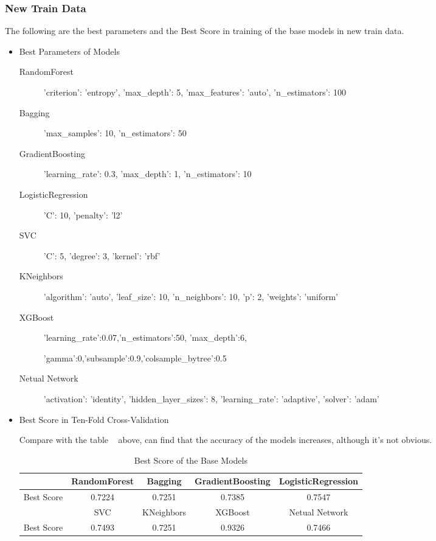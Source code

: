 \subsubsection{New Train Data}

The following are the best parameters and 
the Best Score in training of 
the base models 
in new train data. 

\begin{itemize}
	\item Best Parameters of Models
	\begin{description}
		\item[RandomForest] 'criterion': 'entropy', 'max_depth': 5, 
		'max_features': 'auto', 'n_estimators': 100 
		\item[Bagging] 'max_samples': 10, 'n_estimators': 50
		\item[GradientBoosting] 'learning_rate': 0.3, 
		'max_depth': 1, 'n_estimators': 10
		\item[LogisticRegression] 'C': 10, 'penalty': 'l2'
		\item[SVC] 'C': 5, 'degree': 3, 'kernel': 'rbf'
		\item[KNeighbors] 'algorithm': 'auto', 'leaf_size': 10, 
		'n_neighbors': 10, 'p': 2, 'weights': 'uniform' 
		\item[XGBoost] 'learning_rate':0.07,'n_estimators':50,
		'max_depth':6,
		
		'gamma':0,'subsample':0.9,'colsample_bytree':0.5
		\item[Netual Network] 'activation': 'identity', 
		'hidden_layer_sizes': 8, 'learning_rate': 'adaptive', 'solver': 'adam'
	\end{description}
	
	\item Best Score in Ten-Fold Cross-Validation
	
	Compare with the table ~
	above,
	can find that the accuracy of the models increases,
	although it's not obvious.
	
	\begin{table}[h]  \centering
		\caption{Best Score of the Base Models}
		\label{tbl:best_score_base_models_new}
		\begin{tabular}{ccccc}
			\toprule
			& RandomForest & Bagging & GradientBoosting & 
			LogisticRegression \\
			\midrule
			Best Score & 0.7224 & 0.7251 & 0.7385 & 
			0.7547 \\
			\bottomrule
			\toprule 
			& SVC & KNeighbors & XGBoost & Netual Network\\
			\midrule
			Best Score & 0.7493 & 0.7251 & 0.9326 & 0.7466\\
			\bottomrule
		\end{tabular}
	\end{table}
\end{itemize}


